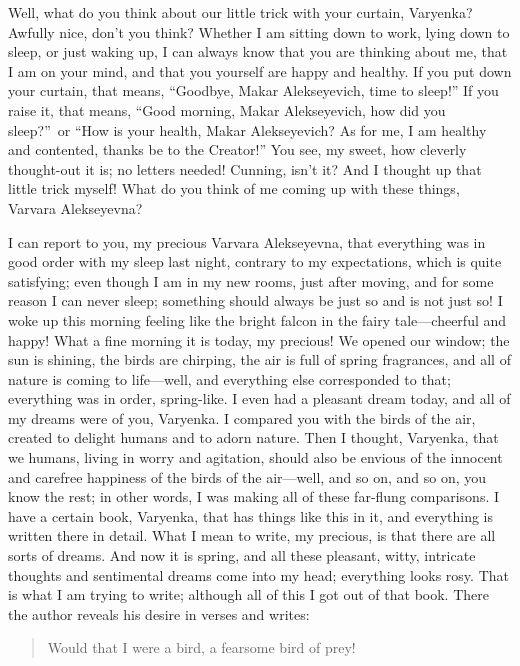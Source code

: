 Well, what do you think about our little trick with your curtain, Varyenka? Awfully nice, don't you think? Whether I am sitting down to work, lying down to sleep, or just waking up, I can always know that you are thinking about me, that I am on your mind, and that you yourself are happy and healthy. If you put down your curtain, that means, ``Goodbye, Makar Alekseyevich, time to sleep!'' If you raise it, that means, ``Good morning, Makar Alekseyevich, how did you sleep?''~or ``How is your health, Makar Alekseyevich? As for me, I am healthy and contented, thanks be to the Creator!'' You see, my sweet, how cleverly thought-out it is; no letters needed! Cunning, isn't it? And I thought up that little trick myself! What do you think of me coming up with these things, Varvara Alekseyevna?

I can report to you, my precious Varvara Alekseyevna, that everything was in good order with my sleep last night, contrary to my expectations, which is quite satisfying; even though I am in my new rooms, just after moving, and for some reason I can never sleep; something should always be just so and is not just so! I woke up this morning feeling like the bright falcon in the fairy tale---cheerful and happy! What a fine morning it is today, my precious! We opened our window; the sun is shining, the birds are chirping, the air is full of spring fragrances, and all of nature is coming to life---well, and everything else corresponded to that; everything was in order, spring-like. I even had a pleasant dream today, and all of my dreams were of you, Varyenka. I compared you with the birds of the air, created to delight humans and to adorn nature. Then I thought, Varyenka, that we humans, living in worry and agitation, should also be envious of the innocent and carefree happiness of the birds of the air---well, and so on, and so on, you know the rest; in other words, I was making all of these far-flung comparisons. I have a certain book, Varyenka, that has things like this in it, and everything is written there in detail. What I mean to write, my precious, is that there are all sorts of dreams. And now it is spring, and all these pleasant, witty, intricate thoughts and sentimental dreams come into my head; everything looks rosy. That is what I am trying to write; although all of this I got out of that book. There the author reveals his desire in verses and writes:

\begin{quotation}
	Would that I were a bird, a fearsome bird of prey!
\end{quotation}

